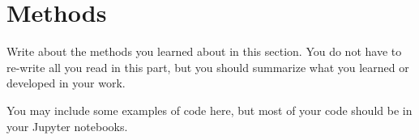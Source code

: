 \section{Methods}

Write about the methods you learned about in this section. You do not have to re-write all you read in this part, but you should summarize what you learned or developed in your work.

You may include some examples of code here, but most of your code should be in your Jupyter notebooks.